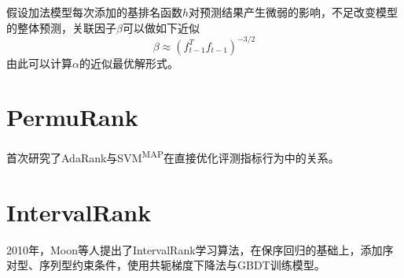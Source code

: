 假设加法模型每次添加的基排名函数$h$对预测结果产生微弱的影响，不足改变模型的整体预测，关联因子$\beta$可以做如下近似
\begin{equation}
    \beta \approx (f_{t-1}^T f_{t-1})^{-3/2}
\end{equation}
由此可以计算$\alpha$的近似最优解形式。

\section{PermuRank}
\cite{xu2008directly}首次研究了AdaRank与SVM\textsuperscript{MAP}在直接优化评测指标行为中的关系。

\section{IntervalRank}
2010年，Moon等人\cite{moon2010intervalrank}提出了IntervalRank学习算法，在保序回归的基础上，添加序对型、序列型约束条件，使用共轭梯度下降法与GBDT训练模型。

